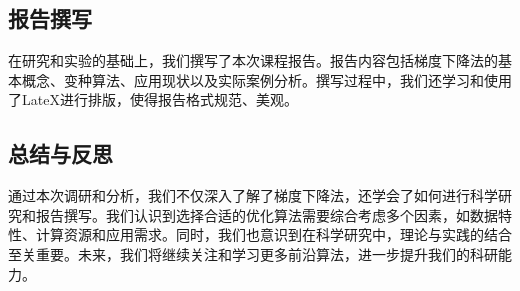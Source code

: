 \documentclass[printMode=true, declarePage=false]{ecnuthesis}
\begin{document}
    \subsection{报告撰写}
    在研究和实验的基础上，我们撰写了本次课程报告。报告内容包括梯度下降法的基本概念、变种算法、应用现状以及实际案例分析。撰写过程中，我们还学习和使用了LateX进行排版，使得报告格式规范、美观。

    \subsection{总结与反思}
    通过本次调研和分析，我们不仅深入了解了梯度下降法，还学会了如何进行科学研究和报告撰写。我们认识到选择合适的优化算法需要综合考虑多个因素，如数据特性、计算资源和应用需求。同时，我们也意识到在科学研究中，理论与实践的结合至关重要。未来，我们将继续关注和学习更多前沿算法，进一步提升我们的科研能力。


    \backmatter
\end{document}
